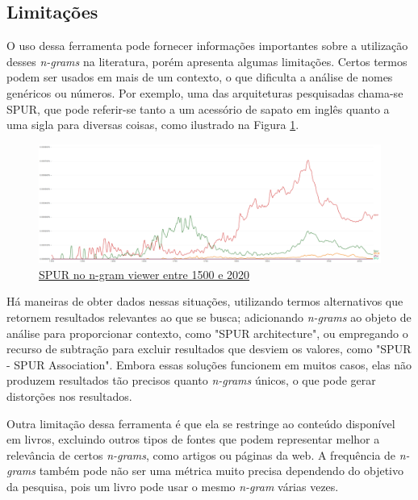 \documentclass[
	article,			%
	11pt,				%
	oneside,			%
	a4paper,			%
	english,			%
	brazil,				%
	sumario=tradicional
	]{abntex2}
\begin{document}
\subsection{Limitações}\label{sec:ngram_pros_cons}

O uso dessa ferramenta pode fornecer informações importantes sobre a utilização desses \textit{n-grams} na literatura, porém apresenta algumas limitações. Certos termos podem ser usados em mais de um contexto, o que dificulta a análise de nomes genéricos ou números. Por exemplo, uma das arquiteturas pesquisadas chama-se SPUR, que pode referir-se tanto a um acessório de sapato em inglês quanto a uma sigla para diversas coisas, como ilustrado na Figura \ref{fig:SPUR}.

\begin{figure}[H]
    \centering
    \includegraphics[width=1\linewidth]{Ngrams/SPUR.png}
    \caption{\href{https://books.google.com/ngrams/graph?content=SPUR&year_start=1500&year_end=2022&corpus=en&smoothing=1&case_insensitive=true}{SPUR no n-gram viewer entre 1500 e 2020}}
    \label{fig:SPUR}
\end{figure}

Há maneiras de obter dados nessas situações, utilizando termos alternativos que retornem resultados relevantes ao que se busca; adicionando \textit{n-grams} ao objeto de análise para proporcionar contexto, como "SPUR architecture", ou empregando o recurso de subtração para excluir resultados que desviem os valores, como "SPUR - SPUR Association". Embora essas soluções funcionem em muitos casos, elas não produzem resultados tão precisos quanto \textit{n-grams} únicos, o que pode gerar distorções nos resultados.

Outra limitação dessa ferramenta é que ela se restringe ao conteúdo disponível em livros, excluindo outros tipos de fontes que podem representar melhor a relevância de certos \textit{n-grams}, como artigos ou páginas da web. A frequência de \textit{n-grams} também pode não ser uma métrica muito precisa dependendo do objetivo da pesquisa, pois um livro pode usar o mesmo \textit{n-gram} várias vezes.
\end{document}
